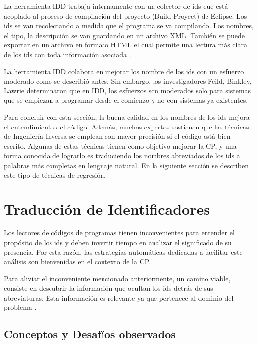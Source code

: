 La herramienta IDD trabaja internamente con un colector de ids que está acoplado al proceso de compilación del proyecto (Build Proyect) de Eclipse. Los ids se van recolectando a medida que el programa se va compilando. Los nombres, el tipo, la descripción se van guardando en un archivo XML. También se puede exportar en un archivo en formato HTML el cual permite una lectura más clara de los ids con toda información asociada \cite{DFPM05}.



La herramienta IDD colabora en mejorar los nombre de los ids con un esfuerzo moderado como se describió antes.
Sin embargo, los investigadores Feild, Binkley, Lawrie \cite{LFBEX07,DLHD06} determinaron que en IDD, los esfuerzos son moderados solo para sistemas que se empiezan a programar desde el comienzo y no con sistemas ya existentes.

Para concluir con esta sección, la buena calidad en los nombres de los ids mejora el entendimiento del código. Además, muchos expertos sostienen que las técnicas de Ingeniería Inversa se emplean con mayor precisión si el código está bien escrito. Algunas de estas técnicas tienen como objetivo mejorar la CP, y una forma conocida de lograrlo es traduciendo los nombres abreviados de los ids a palabras más completas en lenguaje natural. En la siguiente sección se describen este tipo de técnicas de regresión.


\section{Traducción de Identificadores}
\label{sec:tradIdDicc}%

Los lectores de códigos de programas tienen inconvenientes para entender el propósito de los ids y deben invertir tiempo en analizar el significado de su presencia. Por esta razón, las estrategias automáticas dedicadas a facilitar este análisis son bienvenidas en el contexto de la CP.

Para aliviar el inconveniente mencionado anteriormente, un camino viable, consiste en descubrir la información que ocultan los ids detrás de sus abreviaturas. Esta información es relevante ya que pertenece al dominio del problema \cite{EHPV09,LFBEX07}. 

\subsection{Conceptos y Desafíos observados}

